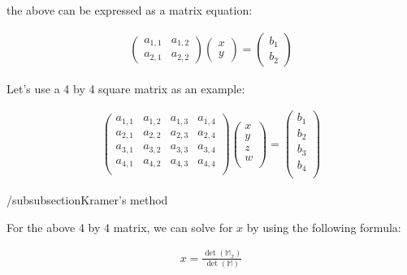 \documentclass{article}
\begin{document}
the above can be expressed as a matrix equation:

\begin{align}
    \begin{pmatrix}
        a_{1,1} & a_{1,2} \\
        a_{2,1} & a_{2,2}
    \end{pmatrix}
    \begin{pmatrix}
        x \\
        y
    \end{pmatrix}
    =
    \begin{pmatrix}
        b_1 \\
        b_2
    \end{pmatrix}
\end{align}

Let's use a 4 by 4 square matrix as an example:

\begin{align}
    \begin{pmatrix}
        a_{1,1} & a_{1,2} & a_{1,3} & a_{1,4} \\
        a_{2,1} & a_{2,2} & a_{2,3} & a_{2,4} \\
        a_{3,1} & a_{3,2} & a_{3,3} & a_{3,4} \\
        a_{4,1} & a_{4,2} & a_{4,3} & a_{4,4} \\
    \end{pmatrix}
    \begin{pmatrix}
        x \\
        y \\
        z \\
        w \\
    \end{pmatrix}
    =
    \begin{pmatrix}
        b_1 \\
        b_2 \\
        b_3 \\
        b_4 \\
    \end{pmatrix}
\end{align}

/subsubsection{Kramer's method}

For the above 4 by 4 matrix, we can solve for $x$ by using the following formula:

\begin{align}
    x = \frac{\det(\mathbb{M}_x)}{\det(\mathbb{M})}
\end{align}
\end{document}

